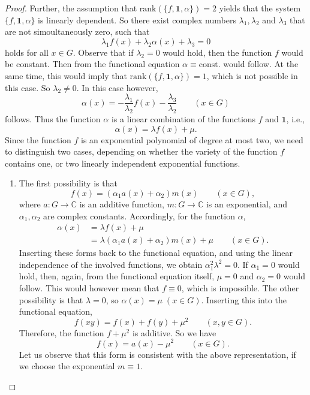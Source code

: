 \documentclass[a4paper,12pt]{article}
\theoremstyle{plain}
\theoremstyle{definition}
\theoremstyle{remark}
\begin{document}
\begin{proof}
Further, the assumption that $\mathrm{rank}(\{f, \mathbf{1}, \alpha \})=2$ yields that the system $\{f, \mathbf{1}, \alpha \}$ is linearly dependent. So there exist complex numbers $\lambda_{1}, \lambda_{2}$ and $\lambda_{3}$ that are not simoultaneously zero, such that 
\[
 \lambda_{1}f(x)+ \lambda_{2}\alpha(x)+\lambda_{3}=0
\]
holds for all $x\in G$. Observe that if $\lambda_{2}=0$ would hold, then the function $f$ would be  constant. Then from the functional equation $\alpha\equiv \mathrm{const.}$ would follow. At the same time, this would imply that $\mathrm{rank}(\{f, \mathbf{1}, \alpha \})=1$, which is not possible in this case. So $\lambda_{2}\neq 0$. In this case however, 
\[
 \alpha(x)= -\frac{\lambda_{1}}{\lambda_{2}}f(x)-\frac{\lambda_{3}}{\lambda_{2}} 
 \qquad 
 \left(x\in G\right)
\]
follows. Thus the function $\alpha$ is a linear combination of the functions $f$ and $\mathbf{1}$, i.e., 
\[
 \alpha(x)= \lambda f(x)+\mu. 
\]
Since the function $f$ is an exponential polynomial of degree at most two, we need to distinguish two cases, depending on whether the variety of the function $f$ contains one,  or two linearly independent exponential functions. 
\begin{enumerate}[{Subcase} (i)]
 \item The first possibility is that 
 \[
  f(x)= (\alpha_{1}a(x)+\alpha_{2})m(x) 
  \qquad 
  \left(x\in G\right), 
 \]
where $a\colon G\to \mathbb{C}$ is an additive function, $m\colon G\to \mathbb{C}$ is an exponential, and $\alpha_{1}, \alpha_{2}$ are complex constants. Accordingly, for the function $\alpha$, 
\begin{align*}
 \alpha(x)&= \lambda f(x)+\mu\\
 &= \lambda (\alpha_{1}a(x)+\alpha_{2})m(x)+\mu 
 \qquad 
 \left(x\in G\right). 
\end{align*}
Inserting these forms back to the functional equation, and using the linear independence of the involved functions, we obtain $\alpha_{1}^2\lambda^{2}=0$. If $\alpha_{1}=0$ would hold, then, again, from the functional equation itself, $\mu=0$ and $\alpha_{2}=0$ would follow. This would however mean that $f\equiv 0$, which is impossible. The other possibility is that $\lambda=0$, so $\alpha(x)= \mu\; (x\in G)$. Inserting this into the functional equation, 
\[
 f(xy)= f(x)+f(y)+\mu^{2} 
 \qquad 
 \left(x, y\in G\right).
\]
Therefore, the function $f+\mu^{2}$ is additive. So we have 
\[
f(x)= a(x)-\mu^{2} 
\qquad 
\left(x\in G\right). 
\]
Let us observe that this form is consistent with the above representation, if we choose the exponential $m\equiv 1$.

\end{enumerate}
\end{proof}
\end{document}
